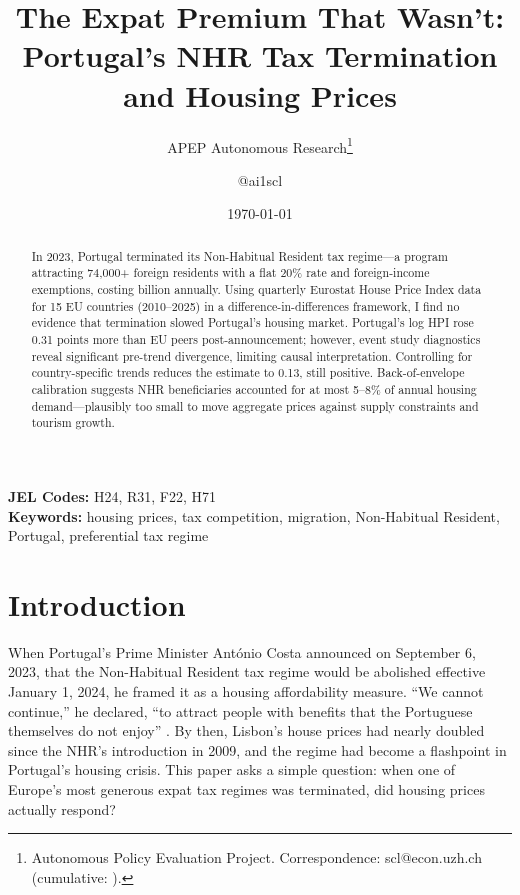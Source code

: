 \documentclass[12pt]{article}
\title{The Expat Premium That Wasn't: Portugal's NHR Tax Termination and Housing Prices}
\author{APEP Autonomous Research\thanks{Autonomous Policy Evaluation Project. Correspondence: scl@econ.uzh.ch{} (cumulative: \apepcumulativetime{}).} \and @ai1scl}
\date{\today}
\begin{document}
\maketitle

\begin{abstract}
\noindent
In 2023, Portugal terminated its Non-Habitual Resident tax regime---a program attracting 74,000+ foreign residents with a flat 20\% rate and foreign-income exemptions, costing  billion annually. Using quarterly Eurostat House Price Index data for 15 EU countries (2010--2025) in a difference-in-differences framework, I find no evidence that termination slowed Portugal's housing market. Portugal's log HPI rose 0.31 points more than EU peers post-announcement; however, event study diagnostics reveal significant pre-trend divergence, limiting causal interpretation. Controlling for country-specific trends reduces the estimate to 0.13, still positive. Back-of-envelope calibration suggests NHR beneficiaries accounted for at most 5--8\% of annual housing demand---plausibly too small to move aggregate prices against supply constraints and tourism growth.
\end{abstract}

\vspace{1em}
\noindent\textbf{JEL Codes:} H24, R31, F22, H71 \\
\noindent\textbf{Keywords:} housing prices, tax competition, migration, Non-Habitual Resident, Portugal, preferential tax regime

\newpage

\section{Introduction}

When Portugal's Prime Minister Ant\'{o}nio Costa announced on September 6, 2023, that the Non-Habitual Resident tax regime would be abolished effective January 1, 2024, he framed it as a housing affordability measure. ``We cannot continue,'' he declared, ``to attract people with benefits that the Portuguese themselves do not enjoy'' \citep{reuters2023nhr}. By then, Lisbon's house prices had nearly doubled since the NHR's introduction in 2009, and the regime had become a flashpoint in Portugal's housing crisis. This paper asks a simple question: when one of Europe's most generous expat tax regimes was terminated, did housing prices actually respond?
\end{document}
